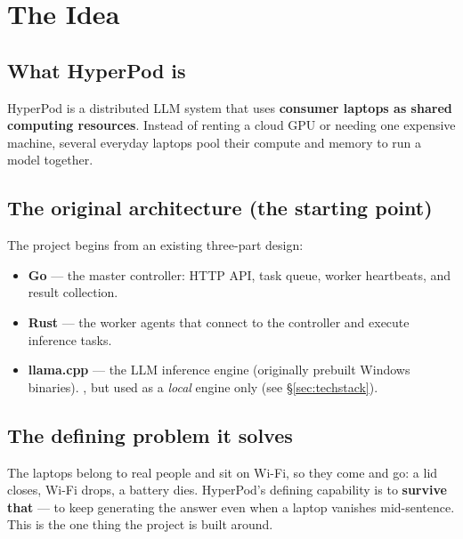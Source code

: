 \section{The Idea}
\label{sec:idea}

\subsection{What HyperPod is}
HyperPod is a distributed LLM system that uses \textbf{consumer laptops as shared
computing resources}. Instead of renting a cloud GPU or needing one expensive
machine, several everyday laptops pool their compute and memory to run a model
together.

\subsection{The original architecture (the starting point)}
The project begins from an existing three-part design:

\begin{itemize}[leftmargin=1.4em,nosep]
  \item \textbf{Go} --- the master controller: HTTP API, task queue, worker
  heartbeats, and result collection. \Keep
  \item \textbf{Rust} --- the worker agents that connect to the controller and
  execute inference tasks. \Keep
  \item \textbf{llama.cpp} --- the LLM inference engine (originally prebuilt
  Windows binaries). \Keep, but used as a \emph{local} engine only (see
  \S\ref{sec:techstack}).
\end{itemize}

\subsection{The defining problem it solves}
The laptops belong to real people and sit on Wi-Fi, so they come and go: a lid
closes, Wi-Fi drops, a battery dies. HyperPod's defining capability is to
\textbf{survive that} --- to keep generating the answer even when a laptop
vanishes mid-sentence. This is the one thing the project is built around.

